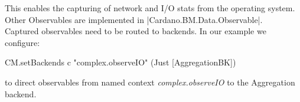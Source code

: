 This enables the capturing of network and I/O stats from the operating system.
Other Observables are implemented in |Cardano.BM.Data.Observable|.
\\
Captured observables need to be routed to backends. In our example we configure:
\begin{spec}
    CM.setBackends c "complex.observeIO" (Just [AggregationBK])
\end{spec}
to direct observables from named context \emph{complex.observeIO} to the
Aggregation backend.
